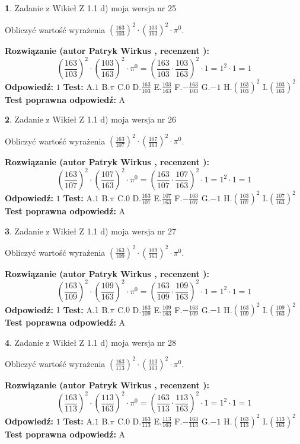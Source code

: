\documentclass[12pt, a4paper]{article}
\theoremstyle{definition} %
\newtheorem{zad}{}
\newcommand{\zadStart}[1]{\begin{zad}#1\newline}
\newcommand{\zadStop}{\end{zad}}
\newcommand{\rozwStart}[2]{\noindent \textbf{Rozwiązanie (autor #1 , recenzent #2): }\newline}
\newcommand{\rozwStop}{\newline}
\newcommand{\odpStart}{\noindent \textbf{Odpowiedź:}\newline}
\newcommand{\odpStop}{\newline}
\newcommand{\testStart}{\noindent \textbf{Test:}\newline}
\newcommand{\testStop}{\newline}
\newcommand{\kluczStart}{\noindent \textbf{Test poprawna odpowiedź:}\newline}
\newcommand{\kluczStop}{\newline}
\begin{document}
\zadStart{Zadanie z Wikieł Z 1.1 d) moja wersja nr 25}

Obliczyć wartość wyrażenia $(\frac{163}{103})^{2} \cdot (\frac{103}{163})^{2} \cdot \pi^{0}$.
\zadStop
\rozwStart{Patryk Wirkus}{}
$$(\frac{163}{103})^{2} \cdot (\frac{103}{163})^{2} \cdot \pi^{0} = (\frac{163}{103} \cdot \frac{103}{163})^{2} \cdot 1 = 1^{2} \cdot 1 = 1$$
\rozwStop
\odpStart
$1$
\odpStop
\testStart
A.$1$ B.$\pi$ C.$0$ D.$\frac{163}{103}$ E.$\frac{103}{163}$
F.$-\frac{163}{103}$ G.$-1$
H.$(\frac{163}{103})^{2}$
I.$(\frac{103}{163})^{2}$
\testStop
\kluczStart
A
\kluczStop



\zadStart{Zadanie z Wikieł Z 1.1 d) moja wersja nr 26}

Obliczyć wartość wyrażenia $(\frac{163}{107})^{2} \cdot (\frac{107}{163})^{2} \cdot \pi^{0}$.
\zadStop
\rozwStart{Patryk Wirkus}{}
$$(\frac{163}{107})^{2} \cdot (\frac{107}{163})^{2} \cdot \pi^{0} = (\frac{163}{107} \cdot \frac{107}{163})^{2} \cdot 1 = 1^{2} \cdot 1 = 1$$
\rozwStop
\odpStart
$1$
\odpStop
\testStart
A.$1$ B.$\pi$ C.$0$ D.$\frac{163}{107}$ E.$\frac{107}{163}$
F.$-\frac{163}{107}$ G.$-1$
H.$(\frac{163}{107})^{2}$
I.$(\frac{107}{163})^{2}$
\testStop
\kluczStart
A
\kluczStop



\zadStart{Zadanie z Wikieł Z 1.1 d) moja wersja nr 27}

Obliczyć wartość wyrażenia $(\frac{163}{109})^{2} \cdot (\frac{109}{163})^{2} \cdot \pi^{0}$.
\zadStop
\rozwStart{Patryk Wirkus}{}
$$(\frac{163}{109})^{2} \cdot (\frac{109}{163})^{2} \cdot \pi^{0} = (\frac{163}{109} \cdot \frac{109}{163})^{2} \cdot 1 = 1^{2} \cdot 1 = 1$$
\rozwStop
\odpStart
$1$
\odpStop
\testStart
A.$1$ B.$\pi$ C.$0$ D.$\frac{163}{109}$ E.$\frac{109}{163}$
F.$-\frac{163}{109}$ G.$-1$
H.$(\frac{163}{109})^{2}$
I.$(\frac{109}{163})^{2}$
\testStop
\kluczStart
A
\kluczStop



\zadStart{Zadanie z Wikieł Z 1.1 d) moja wersja nr 28}

Obliczyć wartość wyrażenia $(\frac{163}{113})^{2} \cdot (\frac{113}{163})^{2} \cdot \pi^{0}$.
\zadStop
\rozwStart{Patryk Wirkus}{}
$$(\frac{163}{113})^{2} \cdot (\frac{113}{163})^{2} \cdot \pi^{0} = (\frac{163}{113} \cdot \frac{113}{163})^{2} \cdot 1 = 1^{2} \cdot 1 = 1$$
\rozwStop
\odpStart
$1$
\odpStop
\testStart
A.$1$ B.$\pi$ C.$0$ D.$\frac{163}{113}$ E.$\frac{113}{163}$
F.$-\frac{163}{113}$ G.$-1$
H.$(\frac{163}{113})^{2}$
I.$(\frac{113}{163})^{2}$
\testStop
\kluczStart
A
\kluczStop
\end{document}
